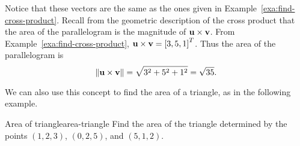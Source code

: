\begin{solution}
  Notice that these vectors are the same as the ones given in Example~\ref{exa:find-cross-product}.  Recall from the geometric description
  of the cross product that the area of the parallelogram is the
  magnitude of $\vect{u} \times \vect{v}$.  From
  Example~\ref{exa:find-cross-product},
  $\vect{u} \times \vect{v} = \mat{3,5,1}^T$.
  Thus the area of the parallelogram is
  \begin{equation*}
    \norm{\vect{u} \times \vect{v}} =
    \sqrt{3^2+5^2+1^2} = \sqrt{35}.
  \end{equation*}
\end{solution}

We can also use this concept to find the area of a triangle, as in the
following example.

\begin{example}{Area of triangle}{area-triangle}
  Find the area of the triangle determined by the points
  $(1,2,3)$, $(0,2,5)$, and $(5,1,2)$.
\end{example}

